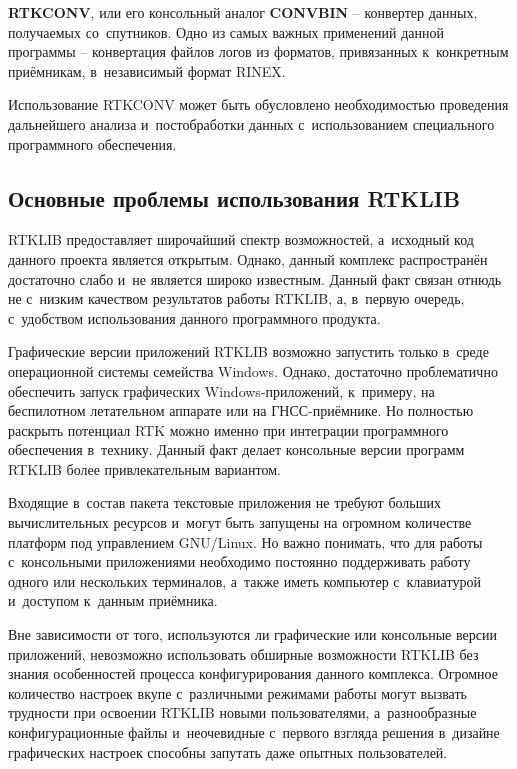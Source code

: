\begin{dashitemize}
  \item \textbf{RTKCONV}, или его консольный аналог \textbf{CONVBIN} -- конвертер данных, получаемых со~спутников. Одно из самых важных применений данной программы -- конвертация файлов логов из форматов, привязанных к~конкретным приёмникам, в~независимый формат RINEX. \par
  
  Использование RTKCONV может быть обусловлено необходимостью проведения дальнейшего анализа и~постобработки данных с~использованием специального программного обеспечения.
\end{dashitemize}

\subsection{Основные проблемы использования RTKLIB}
\label{subsec:rtklib-problems}

RTKLIB предоставляет широчайший спектр возможностей, а~исходный код данного проекта является открытым. Однако, данный комплекс распространён достаточно слабо и~не является широко известным. Данный факт связан отнюдь не с~низким качеством результатов работы RTKLIB, а, в~первую очередь, с~удобством использования данного программного продукта. \par

Графические версии приложений RTKLIB возможно запустить только в~среде операционной системы семейства Windows. Однако, достаточно проблематично обеспечить запуск графических Windows-приложений, к~примеру, на беспилотном летательном аппарате или на ГНСС-приёмнике. Но полностью раскрыть потенциал RTK можно именно при интеграции программного обеспечения в~технику. Данный факт делает консольные версии программ RTKLIB более привлекательным вариантом. \par

Входящие в~состав пакета текстовые приложения не требуют больших вычислительных ресурсов и~могут быть запущены на огромном количестве платформ под управлением GNU/Linux. Но важно понимать, что для работы с~консольными приложениями необходимо постоянно поддерживать работу одного или нескольких терминалов, а~также иметь компьютер с~клавиатурой и~доступом к~данным приёмника. \par

Вне зависимости от того, используются ли графические или консольные версии приложений, невозможно использовать обширные возможности RTKLIB без знания особенностей процесса конфигурирования данного комплекса. Огромное количество настроек вкупе с~различными режимами работы могут вызвать трудности при освоении RTKLIB новыми пользователями, а~разнообразные конфигурационные файлы и~неочевидные с~первого взгляда решения в~дизайне графических настроек способны запутать даже опытных пользователей. \par

